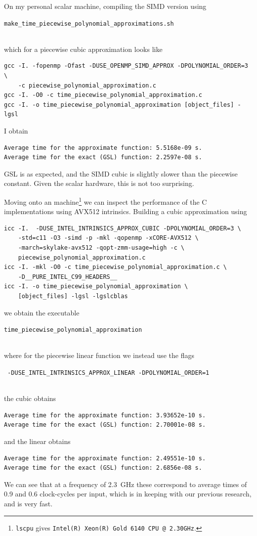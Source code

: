 \documentclass[11pt,a4paper,twoside,english]{extarticle}
\newcommand{\singlecodeline}[1]{\\[1em]\centerline{\lstinline[basicstyle=\ttfamily]$#1$}\\[1em]}
\begin{document}
On my personal scalar machine, compiling the \openmp SIMD version using \singlecodeline{make_time_piecewise_polynomial_approximations.sh} 
which for a piecewise cubic approximation looks like
\begin{verbatim}
gcc -I. -fopenmp -Ofast -DUSE_OPENMP_SIMD_APPROX -DPOLYNOMIAL_ORDER=3 \
    -c piecewise_polynomial_approximation.c
gcc -I. -O0 -c time_piecewise_polynomial_approximation.c
gcc -I. -o time_piecewise_polynomial_approximation [object_files] -lgsl
\end{verbatim}
I obtain
\begin{verbatim}
Average time for the approximate function: 5.5168e-09 s.
Average time for the exact (GSL) function: 2.2597e-08 s.
\end{verbatim}
GSL is as expected, and the SIMD cubic is slightly slower than the piecewise constant. Given the scalar hardware, this is not too surprising. 

Moving onto an \intel machine\footnote{\verb|lscpu| gives \verb|Intel(R) Xeon(R) Gold 6140 CPU @ 2.30GHz|.} we can inspect the performance of the C implementations using AVX512 intrinsics. Building a cubic approximation using
\begin{verbatim}
icc -I.  -DUSE_INTEL_INTRINSICS_APPROX_CUBIC -DPOLYNOMIAL_ORDER=3 \
    -std=c11 -O3 -simd -p -mkl -qopenmp -xCORE-AVX512 \
    -march=skylake-avx512 -qopt-zmm-usage=high -c \
    piecewise_polynomial_approximation.c 
icc -I. -mkl -O0 -c time_piecewise_polynomial_approximation.c \
    -D__PURE_INTEL_C99_HEADERS__
icc -I. -o time_piecewise_polynomial_approximation \
    [object_files] -lgsl -lgslcblas
\end{verbatim}
we obtain the executable
\singlecodeline{time_piecewise_polynomial_approximation} 
where for the piecewise linear function we instead use the flags \singlecodeline{ -DUSE_INTEL_INTRINSICS_APPROX_LINEAR -DPOLYNOMIAL_ORDER=1}
the cubic obtains
\begin{verbatim}
Average time for the approximate function: 3.93652e-10 s.
Average time for the exact (GSL) function: 2.70001e-08 s.
\end{verbatim}
and the linear obtains
\begin{verbatim}
Average time for the approximate function: 2.49551e-10 s.
Average time for the exact (GSL) function: 2.6856e-08 s.
\end{verbatim}
We can see that at a frequency of \SI{2.3}{\giga\hertz} these correspond to average times of 0.9 and 0.6 clock-cycles per input, which is in keeping with our previous research, and is very fast. 
\end{document}
